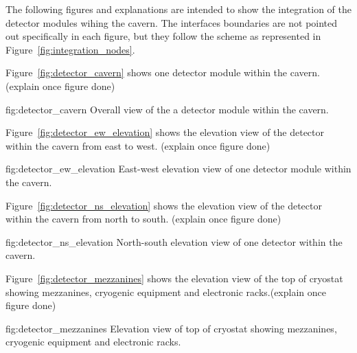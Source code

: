 The following figures and explanations are intended to show the
integration of the detector modules wihing the cavern. The interfaces
boundaries are not pointed out specifically in each figure, but they
follow the scheme as represented in
Figure~\ref{fig:integration_nodes}.

Figure~\ref{fig:detector_cavern} shows one detector module within the
cavern. (explain once figure done)
\begin{dunefigure}{fig:detector_cavern}
  {Overall view of the a detector module within the cavern.}
\end{dunefigure}

Figure~\ref{fig:detector_ew_elevation} shows the elevation view of the
detector within the cavern from east to west. (explain once figure done)
\begin{dunefigure}{fig:detector_ew_elevation}
  {East-west elevation view of one detector module within the cavern.}
\end{dunefigure}

Figure~\ref{fig:detector_ns_elevation} shows the elevation view of the
detector within the cavern from north to south. (explain once figure done)
\begin{dunefigure}{fig:detector_ns_elevation}
  {North-south elevation view of one detector within the cavern.}
\end{dunefigure}

Figure~\ref{fig:detector_mezzanines} shows the elevation view of the top
of cryostat showing mezzanines, cryogenic equipment and electronic
racks.(explain once figure done)
\begin{dunefigure}{fig:detector_mezzanines}
  {Elevation view of top of cryostat showing mezzanines, cryogenic
    equipment and electronic racks.}
\end{dunefigure}

